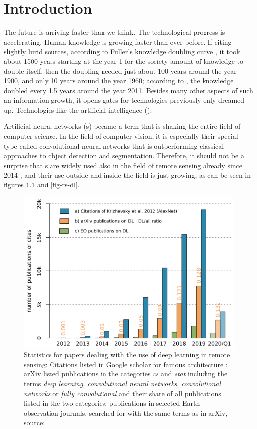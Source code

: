 \chapter{Introduction}
\label{intro}

The future is arriving faster than we think. The technological progress is accelerating. Human knowledge is growing faster than ever before. If citing slightly lurid sources, according to Fuller's knowledge doubling curve \cite{knowledge-doubling-curve}, it took about 1500 years starting at the year 1 for the society amount of knowledge to double itself, then the doubling needed just about 100 years around the year 1900, and only 10 years around the year 1960; according to \cite{growth-forecast}, the knowledge doubled every 1.5 years around the year 2011. Besides many other aspects of such an information growth, it opens gates for technologies previously only dreamed up. Technologies like the artificial intelligence ().

Artificial neural networks (s) became a term that is shaking the entire field of computer science. In the field of computer vision, it is especially their special type called convolutional neural networks that is outperforming classical approaches to object detection and segmentation. Therefore, it should not be a surprise that s are widely used also in the field of remote sensing already since 2014 \cite{review-dl-rs-2017}, and their use outside and inside the field is just growing, as can be seen in figures \ref{fig-dl} and \ref{fig-rs-dl}.

\begin{figure}[h]
   \centering
	\includegraphics[width=0.6\linewidth]{./pictures/dl-papers.png}
	\caption[Papers on the use of DL]{Statistics for papers dealing with the use of deep learning in remote sensing: Citations listed in Google scholar for famous  architecture \cite{cnn-classification}; arXiv listed publications in the categories \textit{cs} and \textit{stat} including the terms \textit{deep learning}, \textit{convolutional neural networks}, \textit{convolutional networks} or \textit{fully convolutional} and their share of all publications listed in the two categories; publications in selected Earth observation journals, searched for with the same terms as in arXiv, source: \cite{review-dl-eo}}
      \label{fig-dl}
\end{figure}

